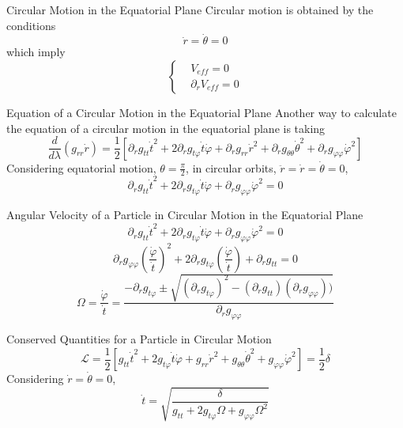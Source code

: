 \documentclass{beamer}
\begin{document}
\begin{frame}{Circular Motion in the Equatorial Plane}
	Circular motion is obtained by the conditions
	\[ \dot{r} = \dot{\theta} = 0 \]
	\pause
	which imply
	\[ \begin{cases}
	 	&V_{eff} = 0\\
	 	&\partial_r V_{eff} = 0
	 	\end{cases} 
	 \]
\end{frame}

\begin{frame}{Equation of a Circular Motion in the Equatorial Plane}
	Another way to calculate the equation of a circular motion in the equatorial plane is taking
	$$\frac{d}{d\lambda} \left( g_{rr} \dot{r} \right) =  \frac{1}{2} \left[ \partial_r g_{tt} \dot{t}^2 + 2\partial_r g_{t \varphi} \dot{t} \dot{\varphi} + \partial_r g_{rr} \dot{r}^2 + \partial_r g_{\theta \theta} \dot{\theta}^2 + \partial_r g_{\varphi \varphi} \dot{\varphi}^2 \right]$$
	\pause
	Considering equatorial motion, $ \theta = \frac{\pi}{2} $, in circular orbits, $\ddot{r} = \dot{r} = \dot{\theta} = 0$, 	
	\pause
	$$\partial_r g_{tt} \dot{t}^2 + 2\partial_r g_{t \varphi} \dot{t} \dot{\varphi} + \partial_r g_{\varphi \varphi} \dot{\varphi}^2 =0$$
\end{frame}

\begin{frame}{Angular Velocity of a Particle in Circular Motion in the Equatorial Plane}
	$$\partial_r g_{tt} \dot{t}^2 + 2\partial_r g_{t \varphi} \dot{t} \dot{\varphi} + \partial_r g_{\varphi \varphi} \dot{\varphi}^2 =0$$
	\pause
	$$ \partial_r g_{\varphi \varphi} \left(\frac{\dot{\varphi}}{\dot{t}}\right)^2 + 2\partial_r g_{t \varphi} \left(\frac{\dot{\varphi}}{\dot{t}}\right) + \partial_r g_{tt}=0$$
	\pause
	$$\Omega =\frac{\dot{\varphi}}{\dot{t}} = \frac{-\partial_r g_{t \varphi} \pm \sqrt{\left(\partial_r g_{t \varphi}\right)^2 - \left(\partial_r g_{tt} \right) \left( \partial_r g_{\varphi \varphi}\right) ) }}{\partial_r g_{\varphi \varphi}} $$	
\end{frame}

\begin{frame}{Conserved Quantities for a Particle in Circular Motion}
	\[ \mathcal{L} =\frac{1}{2} \left[ g_{tt} \dot{t}^2 + 2g_{t \varphi} \dot{t} \dot{\varphi} + g_{rr} \dot{r}^2 + g_{\theta \theta} \dot{\theta}^2 + g_{\varphi \varphi} \dot{\varphi}^2 \right] = \frac{1}{2}  \delta \]
	\pause
	Considering $\dot{r} = \dot{\theta} = 0$, 	
	\[ \dot{t}  = \sqrt{\frac{\delta}{ g_{tt}  + 2g_{t \varphi} \Omega  + g_{\varphi \varphi} \Omega^2 }}\]
\end{frame}
\end{document}
